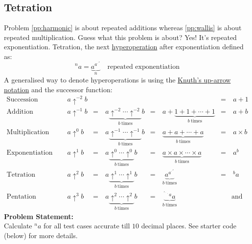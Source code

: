 \documentclass[../../Problems]{subfiles}
\begin{document}
\subsection{Tetration}{\label{pp:tetration}}
Problem \ref{pp:harmonic} is about repeated additions whereas \ref{pp:wallis} is about repeated multiplication. Guess what this problem is about? Yes! It's repeated exponentiation. Tetration, the next \href{https://en.wikipedia.org/wiki/Hyperoperation}{hyperoperation} after exponentiation defined as:%
\begin{equation}
{^{n}a}=\underbrace {a^{a^{\cdot ^{\cdot ^{a}}}}} _{n} \quad\text{repeated exponentiation}
\end{equation}
A generalised way to denote hyperoperations is using the \href{https://en.wikipedia.org/wiki/Knuth's_up-arrow_notation}{Knuth's up-arrow notation} and the successor function:
\begin{align}
\text{Succession }\quad &      a\uparrow ^{-2}b  &&    &&                                                                                                                            &=&\ a + 1\\
\text{Addition }\quad &        a\uparrow ^{-1}b &=&\ a\underbrace{\uparrow^{-2}\cdots\uparrow^{-2}}_{b\ \text{times}} b &=&\ a + \underbrace {1+ 1+ \cdots + 1} _{b\ \text{times}}       &=&\ a+ b\\
\text{Multiplication }\quad &  a\uparrow ^{0}b &=&\ a\underbrace{\uparrow^{-1}\cdots\uparrow^{-1}}_{b\ \text{times}} b &=&\ \underbrace {a+ a+ \cdots + a} _{b\ \text{times}}            &=&\ a\times b\\
\text{Exponentiation }\quad &  a\uparrow ^{1}b &=&\ a\underbrace{\uparrow^0\cdots\uparrow^0}_{b\ \text{times}} b &=&\ \underbrace {a\times a\times \cdots \times a} _{b\ \text{times}}   &=&\ a^{b}\\
\text{Tetration }\quad &       a\uparrow ^{2}b &=&\ a\underbrace{\uparrow^1\cdots\uparrow^1}_{b\ \text{times}} b &=&\ \underbrace {a^{a^{\cdot ^{\cdot ^{a}}}}} _{b\ \text{times}}       &=&\ {^{b}}a\\
\text{Pentation }\quad &       a\uparrow ^{3}b &=&\ a\underbrace{\uparrow^2\cdots\uparrow^2}_{b\ \text{times}} b &=&\ \underbrace {{^{{^{{^{{^{a}}\cdot}}\cdot}}a}}a}_{b\ \text{times}}  &&\text{and so on}
\end{align}
\textbf{Problem Statement:}\\
Calculate ${^{n}a}$ for all test cases accurate till $10$ decimal places. See starter code (below) for more details.
\end{document}
